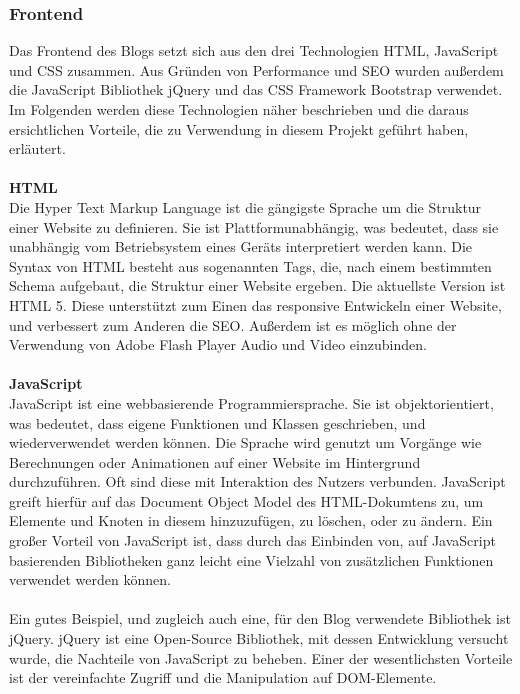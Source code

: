     \subsubsection{Frontend}
    Das Frontend des Blogs setzt sich aus den drei Technologien HTML, JavaScript und CSS zusammen. Aus Gründen von Performance und SEO wurden außerdem
    die JavaScript Bibliothek jQuery und das CSS Framework Bootstrap verwendet. Im Folgenden werden diese Technologien näher beschrieben und die daraus
    ersichtlichen Vorteile, die zu Verwendung in diesem Projekt geführt haben, erläutert.\\
    \\
    \textbf{HTML}\\
    {Die Hyper Text Markup Language\cite{html}} ist die gängigste Sprache um die Struktur einer Website zu definieren. Sie ist Plattformunabhängig, was bedeutet,
    dass sie unabhängig vom Betriebsystem eines Geräts interpretiert werden kann. Die Syntax von HTML besteht aus sogenannten Tags, die, nach einem
    bestimmten Schema aufgebaut, die Struktur einer Website ergeben. Die aktuellste Version ist HTML 5. Diese unterstützt zum Einen das responsive
    Entwickeln einer Website, und verbessert zum Anderen die SEO. Außerdem ist es möglich ohne der Verwendung von Adobe Flash Player Audio und Video einzubinden.\\
    \\
    \textbf{JavaScript}\\
    {JavaScript\cite{javascript}} ist eine webbasierende Programmiersprache. Sie ist objektorientiert, was bedeutet, dass eigene Funktionen und Klassen geschrieben, und wiederverwendet
    werden können. Die Sprache wird genutzt um Vorgänge wie Berechnungen oder Animationen auf einer Website im Hintergrund durchzuführen. Oft sind diese mit Interaktion
    des Nutzers verbunden. JavaScript greift hierfür auf das Document Object Model des HTML-Dokumtens zu, um Elemente und Knoten in diesem hinzuzufügen, zu löschen, oder
    zu ändern. Ein großer Vorteil von JavaScript ist, dass durch das Einbinden von, auf JavaScript basierenden Bibliotheken ganz leicht eine Vielzahl von zusätzlichen Funktionen
    verwendet werden können.\\
    \\
    Ein gutes Beispiel, und zugleich auch eine, für den Blog verwendete Bibliothek ist {jQuery\cite{jquery}}.
    jQuery ist eine Open-Source Bibliothek, mit dessen Entwicklung versucht wurde, die Nachteile von JavaScript zu beheben. Einer der wesentlichsten Vorteile ist
    der vereinfachte Zugriff und die Manipulation auf DOM-Elemente.\\
